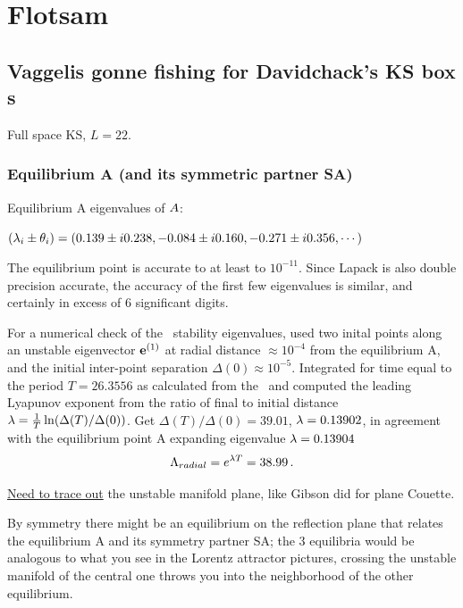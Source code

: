 %

\section{Flotsam}


\subsection{Vaggelis gonne fishing for Davidchack's KS box {\rpo s}}

Full space KS, $L=22$.

\subsubsection{Equilibrium A (and its symmetric partner SA)}

Equilibrium A eigenvalues of ${A}$:

$(\lambda_i \pm \theta_i)
=(
  0.139 \pm i 0.238,
 -0.084 \pm i 0.160,
 -0.271 \pm i 0.356,
\cdots
)$

The equilibrium point is accurate to at least to $10^{-11}$. Since
Lapack is also double precision accurate, the accuracy of the first
few eigenvalues is similar, and certainly in
excess of 6 significant digits.



For a numerical check of the \rpo\ stability eigenvalues,
used two inital
points along an unstable eigenvector ${\bf e}^{(1)}$
at radial distance  $\approx 10^{-4}$ from the equilibrium A,
and the initial inter-point separation $\Delta(0) \approx 10^{-5}$.
Integrated for time equal to the period $T=26.3556$ as calculated from
the \jacobianM\ and computed the leading Lyapunov exponent from the ratio of
final to initial distance 
$\lambda= {1 \over T}\ln( \Delta(T)/\Delta(0))$.
Get
$\Delta(T)/\Delta(0) =39.01$,
$\lambda=0.13902$, in agreement with the equilibrium point A 
expanding eigenvalue $\lambda=0.13904$
\[
\Lambda_{radial} =  e^{\lambda T} =38.99
\,.
\]

\underline{Need to trace out}
the unstable manifold plane, like Gibson did for plane Couette.

By symmetry there might be an equilibrium on the reflection plane that
relates the equilibrium A and its symmetry partner SA; the 3 equilibria would
be analogous to what you see in the Lorentz attractor pictures, crossing
the unstable manifold of the central one throws you into the neighborhood
of the other equilibrium.

